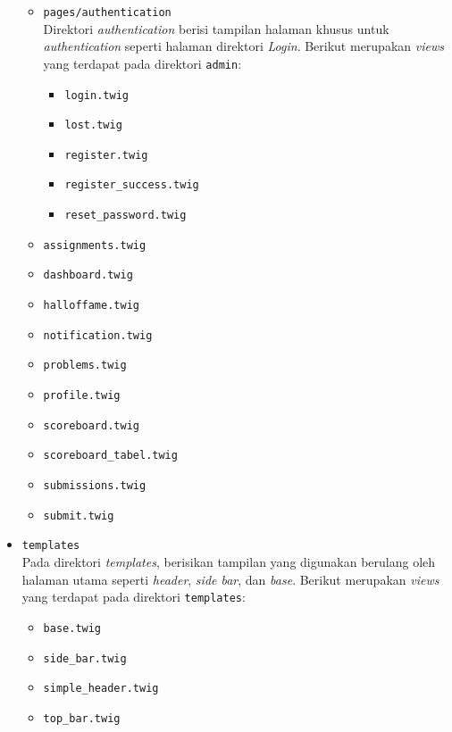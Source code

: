 \begin{itemize}
\begin{itemize}
		      \item \verb|pages/authentication| \\
		            Direktori \textit{authentication} berisi tampilan halaman khusus untuk \textit{authentication} seperti halaman direktori \textit{Login}. Berikut merupakan \textit{views} yang terdapat pada direktori \verb|admin|:

		            \begin{itemize}
			            \item \verb|login.twig|
			            \item \verb|lost.twig|
			            \item \verb|register.twig|
			            \item \verb|register_success.twig|
			            \item \verb|reset_password.twig|
		            \end{itemize}

		      \item \verb|assignments.twig|
		      \item \verb|dashboard.twig|
		      \item \verb|halloffame.twig|
		      \item \verb|notification.twig|
		      \item \verb|problems.twig|
		      \item \verb|profile.twig|
		      \item \verb|scoreboard.twig|
		      \item \verb|scoreboard_tabel.twig|
		      \item \verb|submissions.twig|
		      \item \verb|submit.twig|
	      \end{itemize}

	\item \verb|templates| \\
	      Pada direktori \textit{templates}, berisikan tampilan yang digunakan berulang oleh halaman utama seperti \textit{header}, \textit{side bar}, dan \textit{base}. Berikut merupakan \textit{views} yang terdapat pada direktori \verb|templates|:

	      \begin{itemize}
		      \item \verb|base.twig|
		      \item \verb|side_bar.twig|
		      \item \verb|simple_header.twig|
		      \item \verb|top_bar.twig|
	      \end{itemize}

\end{itemize}

